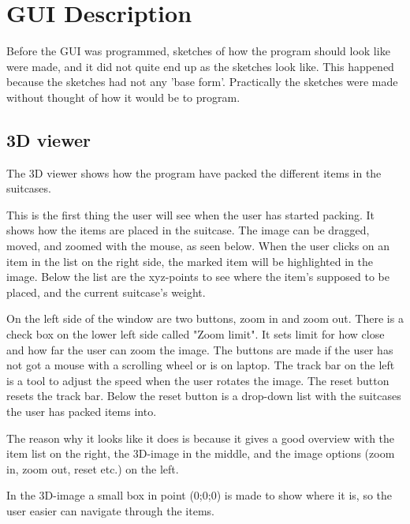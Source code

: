 \section{GUI Description}

Before the GUI was programmed, sketches of how the program should look like were made, and it did not quite end up as the sketches look like. This happened because the sketches had not any 'base form'. Practically the sketches were made without thought of how it would be to program. 

\subsection{3D viewer}
The 3D viewer shows how the program have packed the different items in the suitcases.


This is the first thing the user will see when the user has started packing. It shows how the items are placed in the suitcase.
The image can be dragged, moved, and zoomed with the mouse, as seen below. When the user clicks on an item in the list on the right side, the marked item will be highlighted in the image. Below the list are the xyz-points to see where the item's supposed to be placed, and the current suitcase's weight. 


On the left side of the window are two buttons, zoom in and zoom out. There is a check box on the lower left side called "Zoom limit". It sets limit for how close and how far the user can zoom the image. The buttons are made if the user has not got a mouse with a scrolling wheel or is on laptop. The track bar on the left is a tool to adjust the speed when the user rotates the image. The reset button resets the track bar. Below the reset button is a drop-down list with the suitcases the user has packed items into.

The reason why it looks like it does is because it gives a good overview with the item list on the right, the 3D-image in the middle, and the image options (zoom in, zoom out, reset etc.) on the left.

In the 3D-image a small box in point (0;0;0) is made to show where it is, so the user easier can navigate through the items.